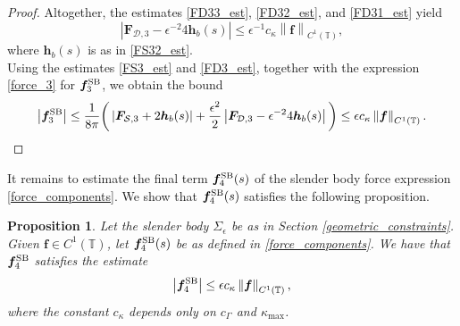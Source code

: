 \documentclass[11pt]{article}
\numberwithin{equation}{section}
\newcommand{\T}{\mathbb{T}}
\newcommand{\SB}{{\rm SB}}
\newcommand{\abs}[1]{\left\lvert #1 \right\rvert}
\newcommand{\norm}[1]{\left\lVert #1 \right\rVert}
\newcommand{\mc}[1]{\mathcal{#1}}
\newtheorem{proposition}[theorem]{Proposition}
\theoremstyle{definition}
\begin{document}
\begin{proof}
Altogether, the estimates \eqref{FD33_est}, \eqref{FD32_est}, and \eqref{FD31_est} yield
\begin{equation}\label{FD3_est}
\abs{\bm{F}_{\mc{D},3} - \epsilon^{-2}4\bm{h}_b(s)} \le \epsilon^{-1}c_\kappa \norm{\bm{f}}_{C^1(\T)},
\end{equation}
where $\bm{h}_b(s)$ is as in \eqref{FS32_est}. \\

Using the estimates \eqref{FS3_est} and \eqref{FD3_est}, together with the expression \eqref{force_3} for $\bm{f}^{\SB}_3$, we obtain the bound
\begin{equation}\label{f3sb_est0}
\abs{\bm{f}^{\SB}_3} \le \frac{1}{8\pi}\bigg( \abs{\bm{F}_{\mc{S},3} + 2\bm{h}_b(s)} + \frac{\epsilon^2}{2}\abs{\bm{F}_{\mc{D},3} -\epsilon^{-2}4\bm{h}_b(s)}\bigg) \le \epsilon c_\kappa \norm{\bm{f}}_{C^1(\T)}.
\end{equation}

\end{proof}


It remains to estimate the final term $\bm{f}^{\SB}_4(s)$ of the slender body force expression \eqref{force_components}. We show that $\bm{f}^{\SB}_4(s)$ satisfies the following proposition.

\begin{proposition}\label{fSB4_est}
Let the slender body $\Sigma_\epsilon$ be as in Section \ref{geometric_constraints}. Given $\bm{f}\in C^1(\T)$, let $\bm{f}^{\SB}_4(s)$ be as defined in \eqref{force_components}. We have that $\bm{f}^{\SB}_4$ satisfies the estimate
\begin{equation}
\abs{\bm{f}^{\SB}_4 } \le \epsilon c_\kappa \norm{\bm{f}}_{C^1(\T)},
\end{equation}
where the constant $c_\kappa$ depends only on $c_{\Gamma}$ and $\kappa_{\max}$.
\end{proposition}
\end{document}
